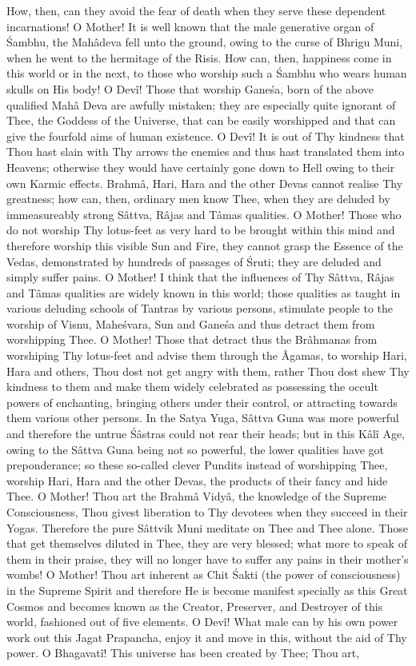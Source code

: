 How, then, can they avoid the fear of death when they serve these dependent incarnations! O Mother! It is well known that the male generative organ of \'Sambhu, the Mah\^adeva fell unto the ground, owing to the curse of Bhrigu Muni, when he went to the hermitage of the Risis. How can, then, happiness come in this world or in the next, to those who worship such a \'Sambhu who wears human skulls on His body! O Dev\^i! Those that worship Gane\'sa, born of the above qualified Mah\^a Deva are awfully mistaken; they are especially quite ignorant of Thee, the Goddess of the Universe, that can be easily worshipped and that can give the fourfold aims of human existence. O Dev\^i! It is out of Thy kindness that Thou hast slain with Thy arrows the enemies and thus hast translated them into Heavens; otherwise they would have certainly gone down to Hell owing to their own Karmic effects. Brahm\^a, Hari, Hara and the other Devas cannot realise Thy greatness; how can, then, ordinary men know Thee, when they are deluded by immeasureably strong S\^attva, R\^ajas and T\^amas qualities. O Mother! Those who do not worship Thy lotus-feet as very hard to be brought within this mind and therefore worship this visible Sun and Fire, they cannot grasp the Essence of the Vedas, demonstrated by hundreds of passages of \'Sruti; they are deluded and simply suffer pains. O Mother! I think that the influences of Thy S\^attva, R\^ajas and T\^amas qualities are widely known in this world; those qualities as taught in various deluding schools of Tantras by various persons, stimulate people to the worship of Visnu, Mahe\'svara, Sun and Gane\'sa and thus detract them from worshipping Thee. O Mother! Those that detract thus the Br\^ahmanas from worshiping Thy lotus-feet and advise them through the \^Agamas, to worship Hari, Hara and others, Thou dost not get angry with them, rather Thou dost shew Thy kindness to them and make them widely celebrated as possessing the occult powers of enchanting, bringing others under their control, or attracting towards them various other persons. In the Satya Yuga, S\^attva Guna was more powerful and therefore the untrue \'S\^astras could not rear their heads; but in this K\^al\^i Age, owing to the S\^attva Guna being not so powerful, the lower qualities have got preponderance; so these so-called clever Pundits instead of worshipping Thee, worship Hari, Hara and the other Devas, the products of their fancy and hide Thee. O Mother! Thou art the Brahm\^a Vidy\^a, the knowledge of the Supreme Consciousness, Thou givest liberation to Thy devotees when they succeed in their Yogas. Therefore the pure S\^attvik Muni meditate on Thee and Thee alone. Those that get themselves diluted in Thee, they are very blessed; what more to speak of them in their praise, they will no longer have to suffer any pains in their mother's wombs! O Mother! Thou art inherent as Chit \'Sakti (the power of consciousness) in the Supreme Spirit and therefore He is become manifest specially as this Great Cosmos and becomes known as the Creator, Preserver, and Destroyer of this world, fashioned out of five elements. O Dev\^i! What male can by his own power work out this Jagat Prapancha, enjoy it and move in this, without the aid of Thy power. O Bhagavat\^i! This universe has been created by Thee; Thou art, 
